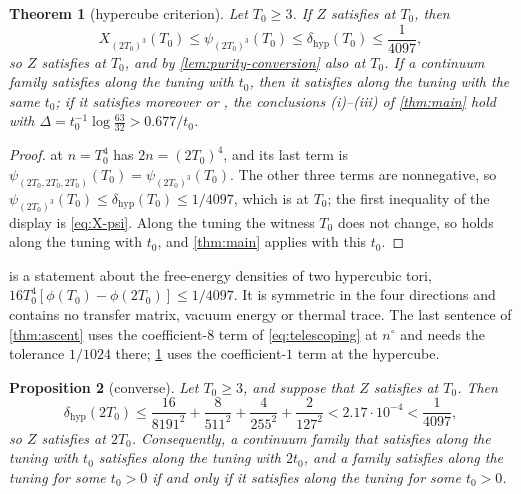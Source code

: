 \documentclass[11pt,a4paper]{amsart}
\newtheorem{theorem}{Theorem}[section]
\newtheorem{proposition}[theorem]{Proposition}
\theoremstyle{definition}
\theoremstyle{remark}
\numberwithin{equation}{section}
\newcommand{\TT}{\mathbb{T}}               %
\newcommand{\Zc}{\mathcal{Z}}              %
\newcommand{\XT}[2]{X_{#1}(#2)}            %
\newcommand{\psiT}[2]{\psi_{#1}(#2)}       %
\newcommand{\cube}[1]{(2#1)^3}             %
\newcommand{\dconst}{\frac{1}{4097}}       %
\newcommand{\dconstinl}{1/4097}            %
\newcommand{\Mcirc}{\text{\upshape(M$^{\circ}$)}}   %
\newcommand{\Bcirc}{\text{\upshape(B$^{\circ}$)}}   %
\newcommand{\Hcirc}{\text{\upshape(H$^{\circ}$)}}   %
\newcommand{\hypW}{\text{\upshape(W)}}              %
\newcommand{\UVB}{\text{\upshape(UVB)}}             %
\newcommand{\tzero}{t_0}                   %
\begin{document}
\begin{theorem}[hypercube criterion]\label{thm:hypercube}
Let $T_0\ge3$. If $Z$ satisfies \Hcirc{} at $T_0$, then
\[
\XT{\cube{T_0}}{T_0}\le\psiT{\cube{T_0}}{T_0}\le\delta_{\mathrm{hyp}}(T_0)\le\dconst ,
\]
so $Z$ satisfies \Mcirc{} at $T_0$, and by \cref{lem:purity-conversion} also \Bcirc{} at $T_0$. If a continuum family satisfies \Hcirc{} along the tuning with $\tzero$, then it satisfies \Mcirc{} along the tuning with the same $\tzero$; if it satisfies moreover \UVB{} or \hypW, the conclusions \textup{(i)}--\textup{(iii)} of \cref{thm:main} hold with $\Delta=\tzero^{-1}\log\frac{63}{32}>0.677/\tzero$.
\end{theorem}

\begin{proof}
 at $n=T_0^4$ has $2n=(2T_0)^4$, and its last term is $\psiT{(2T_0,2T_0,2T_0)}{T_0}=\psiT{\cube{T_0}}{T_0}$. The other three terms are nonnegative, so $\psiT{\cube{T_0}}{T_0}\le\delta_{\mathrm{hyp}}(T_0)\le\dconstinl$, which is \Mcirc{} at $T_0$; the first inequality of the display is \eqref{eq:X-psi}. Along the tuning the witness $T_0$ does not change, so \Mcirc{} holds along the tuning with $\tzero$, and \cref{thm:main} applies with this $\tzero$.
\end{proof}

\Hcirc{} is a statement about the free-energy densities of two hypercubic tori, $16T_0^4[\phi(T_0)-\phi(2T_0)]\le\dconstinl$. It is symmetric in the four directions and contains no transfer matrix, vacuum energy or thermal trace. The last sentence of \cref{thm:ascent} uses the coefficient-$8$ term of \eqref{eq:telescoping} at $n^\circ$ and needs the tolerance $1/1024$ there; \cref{thm:hypercube} uses the coefficient-$1$ term at the hypercube.

\begin{proposition}[converse]\label{prop:hypercube-converse}
Let $T_0\ge3$, and suppose that $Z$ satisfies \Bcirc{} at $T_0$. Then
\begin{equation}\label{eq:hypercube-converse}
\delta_{\mathrm{hyp}}(2T_0)\le\frac{16}{8191^2}+\frac{8}{511^2}+\frac{4}{255^2}+\frac{2}{127^2}<2.17\cdot10^{-4}<\dconst ,
\end{equation}
so $Z$ satisfies \Hcirc{} at $2T_0$. Consequently, a continuum family that satisfies \Mcirc{} along the tuning with $\tzero$ satisfies \Hcirc{} along the tuning with $2\tzero$, and a family satisfies \Hcirc{} along the tuning for some $\tzero>0$ if and only if it satisfies \Mcirc{} along the tuning for some $\tzero>0$.
\end{proposition}
\end{document}
